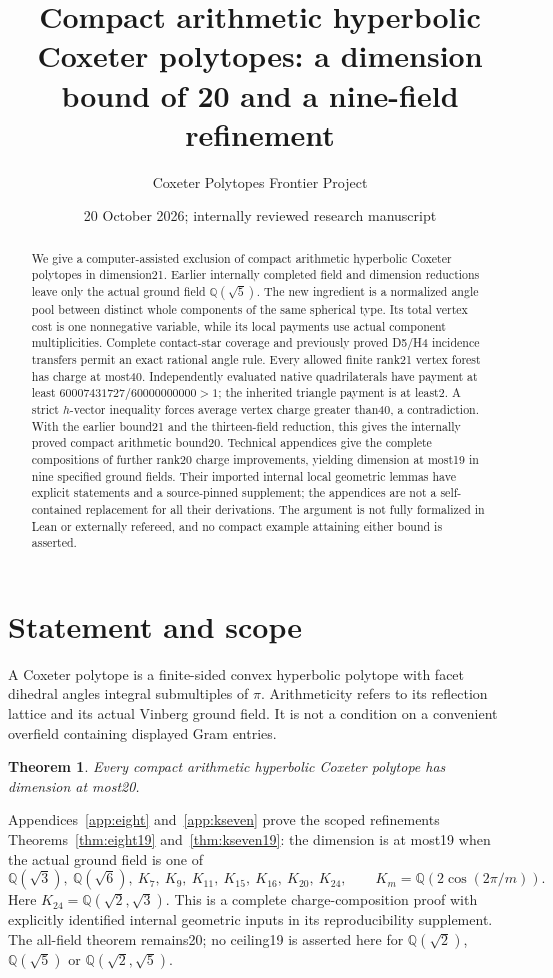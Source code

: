 \documentclass[11pt]{article}
\title{Compact arithmetic hyperbolic Coxeter polytopes:\linebreak
a dimension bound of 20 and a nine-field refinement}
\author{Coxeter Polytopes Frontier Project}
\date{20 October 2026; internally reviewed research manuscript}
\newtheorem{theorem}{Theorem}[section]
\newcommand{\Q}{\mathbb Q}
\begin{document}
\maketitle
\begin{abstract}
We give a computer-assisted exclusion of compact arithmetic hyperbolic
Coxeter polytopes in dimension21. Earlier internally completed field and
dimension reductions leave only the actual ground field $\Q(\sqrt5)$.
The new ingredient is a normalized angle pool between distinct whole
components of the same spherical type. Its total vertex cost is one
nonnegative variable, while its local payments use actual component
multiplicities. Complete contact-star coverage and previously proved
D5/H4 incidence transfers permit an exact rational angle rule. Every
allowed finite rank21 vertex forest has charge at most40. Independently
evaluated native quadrilaterals have payment at least
$60007431727/60000000000>1$; the inherited triangle payment is at least2.
A strict $h$-vector inequality forces average vertex charge greater than40,
a contradiction. With the earlier bound21 and the thirteen-field reduction,
this gives the internally proved compact arithmetic bound20. Technical
appendices give the complete compositions of further rank20 charge
improvements, yielding dimension at most19 in nine specified ground fields.
Their imported internal local geometric lemmas have explicit statements and
a source-pinned supplement; the appendices are not a self-contained
replacement for all their derivations. The argument is not fully
formalized in Lean or externally refereed, and no compact example
attaining either bound is asserted.
\end{abstract}

\section{Statement and scope}
A Coxeter polytope is a finite-sided convex hyperbolic polytope with facet
dihedral angles integral submultiples of $\pi$. Arithmeticity refers to
its reflection lattice and its actual Vinberg ground field. It is not a
condition on a convenient overfield containing displayed Gram entries.
\begin{theorem}\label{thm:main}
Every compact arithmetic hyperbolic Coxeter polytope has dimension at most20.
\end{theorem}
Appendices~\ref{app:eight} and~\ref{app:kseven} prove the scoped refinements
Theorems~\ref{thm:eight19} and~\ref{thm:kseven19}: the dimension is at most19 when the actual
ground field is one of
\[
 \Q(\sqrt3),\ \Q(\sqrt6),\ K_7,\ K_9,\ K_{11},\ K_{15},\ K_{16},\ K_{20},\ K_{24},
 \qquad K_m=\Q(2\cos(2\pi/m)).
\]
Here $K_{24}=\Q(\sqrt2,\sqrt3)$. This is a complete charge-composition
proof with explicitly identified internal geometric inputs in its
reproducibility supplement. The all-field theorem remains20; no
ceiling19 is asserted here for $\Q(\sqrt2)$, $\Q(\sqrt5)$
or $\Q(\sqrt2,\sqrt5)$.
\end{document}
